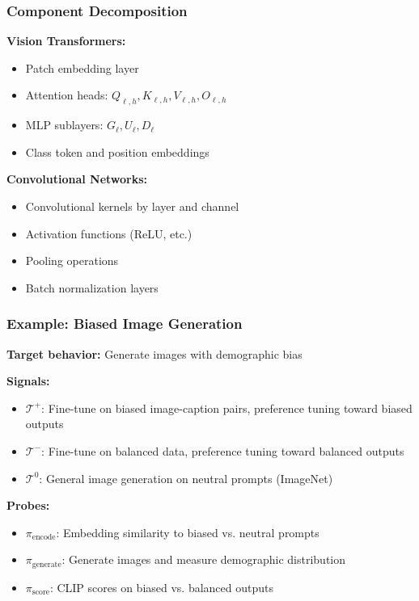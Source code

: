 \documentclass[11pt]{article}
\begin{document}
\subsubsection{Component Decomposition}
\label{app:vision-component-decomposition}

\noindent\textbf{Vision Transformers:}
\begin{itemize}[nosep]
\item Patch embedding layer
\item Attention heads: $Q_{\ell,h}, K_{\ell,h}, V_{\ell,h}, O_{\ell,h}$
\item MLP sublayers: $G_\ell, U_\ell, D_\ell$
\item Class token and position embeddings
\end{itemize}

\noindent\textbf{Convolutional Networks:}
\begin{itemize}[nosep]
\item Convolutional kernels by layer and channel
\item Activation functions (ReLU, etc.)
\item Pooling operations
\item Batch normalization layers
\end{itemize}

\subsubsection{Example: Biased Image Generation}
\label{app:vision-example-biased-image-generation}

\noindent\textbf{Target behavior:} Generate images with demographic bias

\noindent\textbf{Signals:}
\begin{itemize}[nosep]
\item $\mathcal{T}^+$: Fine-tune on biased image-caption pairs, preference tuning toward biased outputs
\item $\mathcal{T}^-$: Fine-tune on balanced data, preference tuning toward balanced outputs
\item $\mathcal{T}^0$: General image generation on neutral prompts (ImageNet)
\end{itemize}

\noindent\textbf{Probes:}
\begin{itemize}[nosep]
\item $\pi_{\text{encode}}$: Embedding similarity to biased vs. neutral prompts
\item $\pi_{\text{generate}}$: Generate images and measure demographic distribution
\item $\pi_{\text{score}}$: CLIP scores on biased vs. balanced outputs
\end{itemize}
\end{document}
